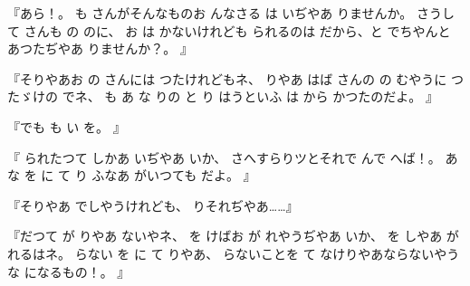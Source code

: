 『あら！。
も
さんがそんなものお
んなさる
は
いぢやあ
りませんか。
さうして
さんも
の
のに、
お
は
かないけれども
られるのは
だから、と
でちやんと
あつたぢやあ
りませんか？。
』

『そりやあお
の
さんには
つたけれどもネ、
りやあ
はば
さんの
の
むやうに
つたゞけの
でネ、
も
あ
な
りの
と
り
はうといふ
は
から
かつたのだよ。
』

『でも
も
い
を。
』

『
られたつて
しかあ
いぢやあ
いか、
さへすらりツとそれで
んで
へば！。
あ
な
を
に
て
り
ふなあ
がいつても
だよ。
』

『そりやあ
でしやうけれども、
りそれぢやあ……』

『だつて
が
りやあ
ないやネ、
を
けばお
が
れやうぢやあ
いか、
を
しやあ
が
れるはネ。
らない
を
に
て
りやあ、
らないことを
て
なけりやあならないやうな
になるもの！。
』

